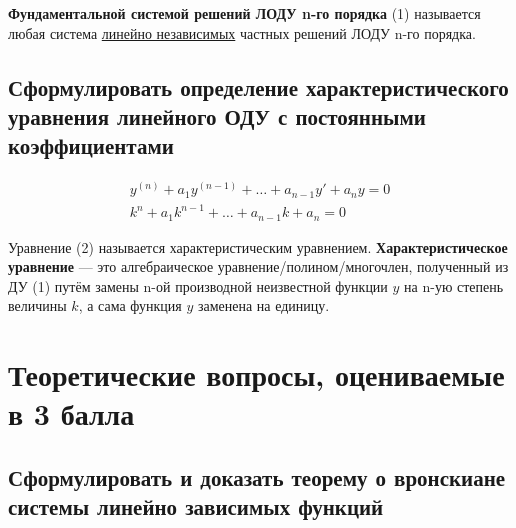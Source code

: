 \begin{definition*}
    \textbf{Фундаментальной системой решений ЛОДУ n-го порядка} (1) называется любая система \underline{линейно независимых} частных решений ЛОДУ n-го порядка.
\end{definition*}

\newpage
\subsection{Сформулировать определение характеристического уравнения линейного ОДУ с постоянными коэффициентами}

\begin{align*}
    y^{(n)} + a_1 y^{(n-1)} + \ldots + a_{n-1} y' + a_n y = 0 \tag{1} \\
    \boxed{k^n + a_1k^{n-1} + \ldots + a_{n-1} k + a_n = 0} \tag{2}
\end{align*}
\begin{definition}
    Уравнение (2) называется характеристическим уравнением. \textbf{Характеристическое уравнение} --- это алгебраическое уравнение/полином/многочлен, полученный из ДУ (1) путём замены n-ой производной неизвестной функции $y$ на n-ую степень величины $k$, а сама функция $y$ заменена на единицу.
\end{definition}

\section{Теоретические вопросы, оцениваемые в 3 балла}

\subsection{Сформулировать и доказать теорему о вронскиане системы линейно зависимых функций}

